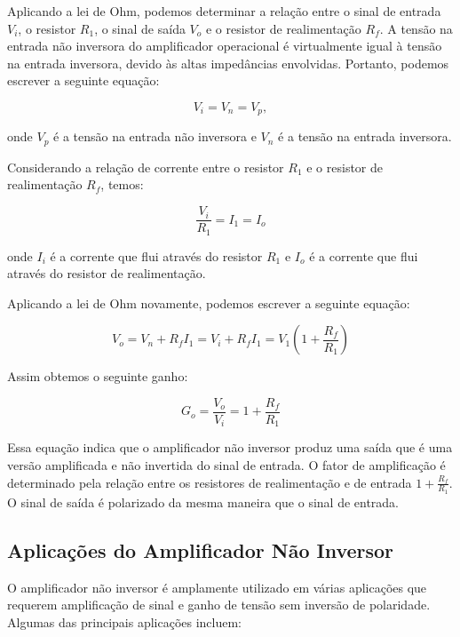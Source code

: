 \documentclass[12pt,twoside, a4paper, twocolumn]{article}
\begin{document}
Aplicando a lei de Ohm, podemos determinar a relação entre o sinal de entrada $V_i$, o resistor $R_1$, o sinal de saída $V_o$ e o resistor de realimentação $R_f$. A tensão na entrada não inversora do amplificador operacional é virtualmente igual à tensão na entrada inversora, devido às altas impedâncias envolvidas. Portanto, podemos escrever a seguinte equação:


\begin{equation}
    V_i = V_n = V_p,
\end{equation}


onde $V_p$ é a tensão na entrada não inversora e $V_n$ é a tensão na entrada inversora.


Considerando a relação de corrente entre o resistor $R_1$ e o resistor de realimentação $R_f$, temos:


\begin{equation}
    \frac{V_i}{R_1} = I_1 = I_o
\end{equation}


onde $I_i$ é a corrente que flui através do resistor $R_1$ e $I_o$ é a corrente que flui através do resistor de realimentação.


Aplicando a lei de Ohm novamente, podemos escrever a seguinte equação:


\begin{equation}
    V_o = V_n + R_f I_1 = V_i + R_f I_1 = V_1 (1 + \frac{R_f}{R_1})
\end{equation}


Assim obtemos o seguinte ganho:


\begin{equation}
    G_o = \frac{V_o}{V_i} = 1 + \frac{R_f}{R_1}
\end{equation}


Essa equação indica que o amplificador não inversor produz uma saída que é uma versão amplificada e não invertida do sinal de entrada. O fator de amplificação é determinado pela relação entre os resistores de realimentação e de entrada $1 + \frac{R_f}{R_1}$. O sinal de saída é polarizado da mesma maneira que o sinal de entrada.


\subsection{Aplicações do Amplificador Não Inversor}


O amplificador não inversor é amplamente utilizado em várias aplicações que requerem amplificação de sinal e ganho de tensão sem inversão de polaridade. Algumas das principais aplicações incluem:
\end{document}
